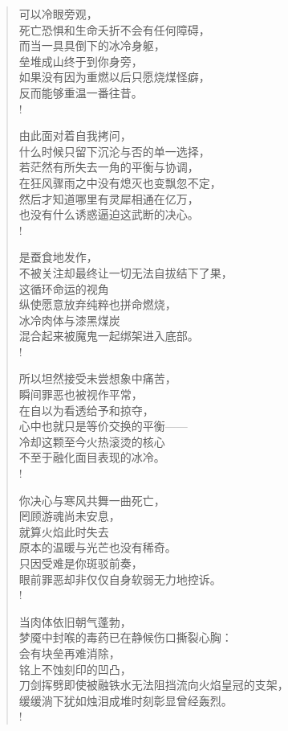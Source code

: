 \documentclass[UTF8, 12pt, a4paper]{ctexrep} %
\begin{document}
\begin{verse}
    可以冷眼旁观，\\
    死亡恐惧和生命夭折不会有任何障碍，\\
    而当一具具倒下的冰冷身躯，\\
    垒堆成山终于到你身旁，\\
    如果没有因为重燃以后只愿烧煤怪癖，\\
    反而能够重温一番往昔。\\!

    由此面对着自我拷问，\\
    什么时候只留下沉沦与否的单一选择，\\
    若茫然有所失去一角的平衡与协调，\\
    在狂风骤雨之中没有熄灭也变飘忽不定，\\
    然后才知道哪里有灵犀相通在亿万，\\
    也没有什么诱惑逼迫这武断的决心。\\!

    是蚕食地发作，\\
    不被关注却最终让一切无法自拔结下了果，\\
    这循环命运的视角\\
    纵使愿意放弃纯粹也拼命燃烧，\\
    冰冷肉体与漆黑煤炭\\
    混合起来被魔鬼一起绑架进入底部。\\!

    所以坦然接受未尝想象中痛苦，\\
    瞬间罪恶也被视作平常，\\
    在自以为看透给予和掠夺，\\
    心中也就只是等价交换的平衡——\\
    冷却这颗至今火热滚烫的核心\\
    不至于融化面目表现的冰冷。\\!

    你决心与寒风共舞一曲死亡，\\
    罔顾游魂尚未安息，\\
    就算火焰此时失去\\
    原本的温暖与光芒也没有稀奇。\\
    只因受难是你斑驳前奏，\\
    眼前罪恶却非仅仅自身软弱无力地控诉。\\!

    当肉体依旧朝气蓬勃，\\
    梦魇中封喉的毒药已在静候伤口撕裂心胸：\\
    会有块垒再难消除，\\
    铭上不蚀刻印的凹凸，\\
    刀剑挥劈即使被融铁水无法阻挡流向火焰皇冠的支架，\\
    缓缓淌下犹如烛泪成堆时刻彰显曾经轰烈。\\!


\end{verse}
\end{document}
